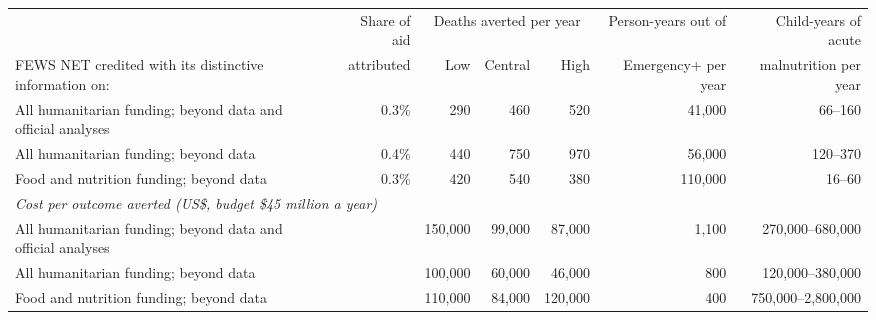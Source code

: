 \begin{tabular}{lrrrrrr}
\toprule
 & Share of aid & \multicolumn{3}{c}{Deaths averted per year} & Person-years out of & Child-years of acute \\
\cmidrule(lr){3-5}
FEWS NET credited with its distinctive information on: & attributed & Low & Central & High & Emergency+ per year & malnutrition per year \\
\midrule
All humanitarian funding; beyond data and official analyses & 0.3\% & 290 & 460 & 520 & 41,000 & 66--160 \\
All humanitarian funding; beyond data & 0.4\% & 440 & 750 & 970 & 56,000 & 120--370 \\
Food and nutrition funding; beyond data & 0.3\% & 420 & 540 & 380 & 110,000 & 16--60 \\
\midrule
\multicolumn{7}{l}{\textit{Cost per outcome averted (US\$, budget \$45 million a year)}} \\
\quad All humanitarian funding; beyond data and official analyses & & 150,000 & 99,000 & 87,000 & 1,100 & 270,000--680,000 \\
\quad All humanitarian funding; beyond data & & 100,000 & 60,000 & 46,000 & 800 & 120,000--380,000 \\
\quad Food and nutrition funding; beyond data & & 110,000 & 84,000 & 120,000 & 400 & 750,000--2,800,000 \\
\bottomrule
\end{tabular}